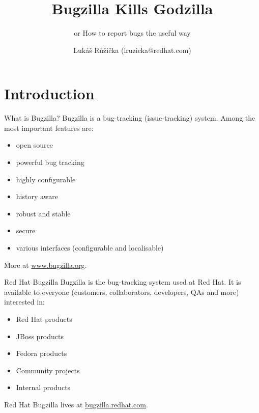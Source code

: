 \documentclass[12pt]{beamer}
\begin{document}
	\author{Lukáš Růžička (lruzicka@redhat.com)}
	\title{Bugzilla Kills Godzilla}
	\subtitle{or How to report bugs the useful way}
	\date{}

\begin{frame}[plain]
	\maketitle 
\end{frame}

\section{Introduction}

\begin{frame}{What is Bugzilla?}
Bugzilla is a bug-tracking (issue-tracking) system. Among the most important features are:

\begin{itemize}
\item open source
\item powerful bug tracking
\item highly configurable
\item history aware
\item robust and stable
\item secure
\item various interfaces (configurable and localisable)
\end{itemize}

More at {\color{blue}\url{www.bugzilla.org}}.
\end{frame}

\begin{frame}{Red Hat Bugzilla}
Bugzilla is the bug-tracking system used at Red Hat. It is available to everyone (customers, collaborators, developers, QAs and more) interested in:

\begin{itemize}
	\item Red Hat products
	\item JBoss products
	\item Fedora products
	\item Community projects
	\item Internal products
\end{itemize}

Red Hat Bugzilla lives at {\color{red}\url{bugzilla.redhat.com}}.
\end{frame}
\end{document}
